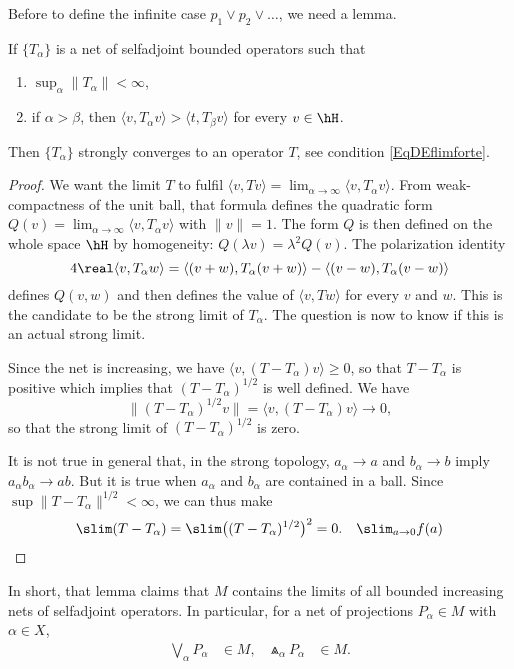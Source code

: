 Before to define the infinite case $p_1\vee p_2\vee\ldots$, we need a lemma.

\begin{lemma}
	If $\{ T_{\alpha} \}$ is a net of selfadjoint bounded operators such that
	\begin{enumerate}
		\item $\sup_{\alpha}\| T_{\alpha} \|<\infty$,
		\item if $\alpha >\beta$, then $\langle v, T_{\alpha} v\rangle >\langle t, T_{\beta} v\rangle $ for every $v\in\hH$.
	\end{enumerate}
	Then $\{ T_{\alpha} \}$ strongly converges to an operator $T$, see condition \eqref{EqDEflimforte}.
\end{lemma}

\begin{proof}
	We want the limit $T$ to fulfil $\langle v, Tv\rangle =\lim_{\alpha\to\infty}\langle v, T_{\alpha} v\rangle$. From weak-compactness of the unit ball, that formula defines the quadratic form $Q(v)=\lim_{\alpha\to\infty}\langle v, T_{\alpha} v\rangle $ with $\| v \|=1$. The form $Q$ is then defined on the whole space $\hH$ by homogeneity: $Q(\lambda v)=\lambda^2 Q(v)$. The polarization identity
	\[
		4\real\langle v, T_{\alpha} w\rangle =\langle (v+w), T_{\alpha}(v+w)\rangle -\langle (v-w), T_{\alpha}(v-w)\rangle
	\]
	defines $Q(v,w)$ and then defines the value of $\langle v, Tw\rangle $ for every $v$ and $w$. This is the candidate to be the strong limit of $T_{\alpha}$. The question is now to know if this is an actual strong limit.

	Since the net is increasing, we have $\langle v, (T-T_{\alpha})v\rangle \geq0$, so that $T-T_{\alpha}$ is positive which implies that $(T-T_{\alpha})^{1/2}$ is well defined. We have
	\[
		\| (T-T_{\alpha})^{1/2}v \|=\langle v, (T-T_{\alpha})v\rangle \to 0,
	\]
	so that the strong limit of $(T-T_{\alpha})^{1/2}$ is zero.

	It is not true in general that, in the strong topology, $a_{\alpha}\to a$ and $b_{\alpha}\to b$ imply $a_{\alpha} b_{\alpha}\to ab$. But it is true when $a_{\alpha}$ and $b_{\alpha}$ are contained in a ball. Since $\sup \| T-T_{\alpha} \|^{1/2}<\infty$, we can thus make
	\[
		\slim(T-T_{\alpha})=\slim\big( (T-T_{\alpha})^{1/2} \big)^2=0.\quad \slim_{a\to 0}f(a)
	\]
\end{proof}
In short, that lemma claims that $M$ contains the limits of all bounded increasing nets of selfadjoint operators. In particular, for a net of projections $P_{\alpha}\in M$ with $\alpha\in X$,
\begin{align*}
	\bigvee_{\alpha}P_{\alpha} & \in M, &
	\Wedge_{\alpha}P_{\alpha}  & \in M.
\end{align*}


